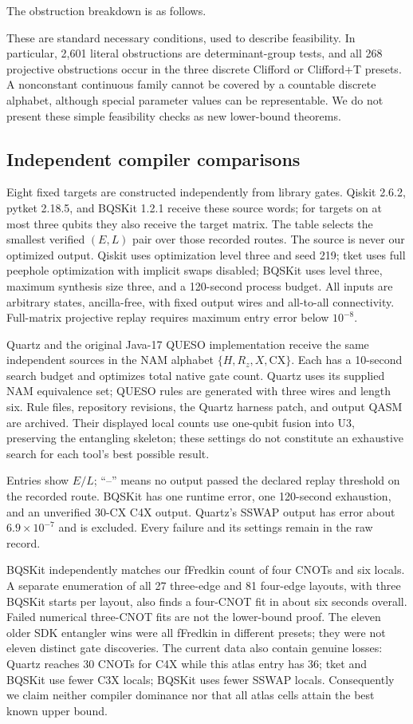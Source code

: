 \documentclass[11pt]{article}
\newcommand{\CNOT}{\mathrm{CX}}
\begin{document}
The obstruction breakdown is as follows.

These are standard necessary conditions, used to describe feasibility.
In particular, 2,601 literal obstructions are determinant-group tests, and
all 268 projective obstructions occur in the three discrete Clifford or
Clifford+T presets. A nonconstant continuous family cannot be covered by a
countable discrete alphabet, although special parameter values can be
representable. We do not present these simple feasibility checks as new
lower-bound theorems.

\subsection{Independent compiler comparisons}
Eight fixed targets are constructed independently from library gates.
Qiskit 2.6.2, pytket 2.18.5, and BQSKit 1.2.1 receive these source words;
for targets on at most three qubits they also receive the target matrix.
The table selects the smallest verified $(E,L)$ pair over those recorded
routes. The source is never our optimized output. Qiskit uses optimization
level three and seed 219; tket uses full peephole optimization with implicit
swaps disabled; BQSKit uses level three, maximum synthesis size three, and
a 120-second process budget. All inputs are arbitrary states, ancilla-free,
with fixed output wires and all-to-all connectivity. Full-matrix projective
replay requires maximum entry error below $10^{-8}$.

Quartz and the original Java-17 QUESO implementation receive the same
independent sources in the NAM alphabet $\{H,R_z,X,\CNOT\}$. Each has a
10-second search budget and optimizes total native gate count. Quartz uses
its supplied NAM equivalence set; QUESO rules are generated with three wires
and length six. Rule files, repository revisions, the Quartz harness patch,
and output QASM are archived. Their displayed local counts use one-qubit
fusion into U3, preserving the entangling skeleton; these settings do not
constitute an exhaustive search for each tool's best possible result.

Entries show $E/L$; ``--'' means no output passed the declared replay
threshold on the recorded route. BQSKit has one runtime error, one
120-second exhaustion, and an unverified 30-CX C4X output. Quartz's SSWAP
output has error about $6.9\times10^{-7}$ and is excluded. Every failure and
its settings remain in the raw record.

BQSKit independently matches our fFredkin count of four CNOTs and six
locals. A separate enumeration of all 27 three-edge and 81 four-edge layouts,
with three BQSKit starts per layout, also finds a four-CNOT fit in about six
seconds overall. Failed numerical three-CNOT fits are not the lower-bound
proof. The eleven older SDK entangler wins were all fFredkin in different
presets; they were not eleven distinct gate discoveries. The current data
also contain genuine losses: Quartz reaches 30 CNOTs for C4X while this
atlas entry has 36; tket and BQSKit use fewer C3X locals; BQSKit uses fewer
SSWAP locals. Consequently we claim neither compiler dominance nor that
all atlas cells attain the best known upper bound.
\end{document}
